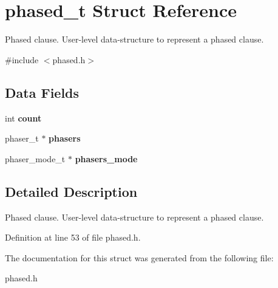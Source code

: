 \hypertarget{structphased__t}{\section{phased\-\_\-t Struct Reference}
\label{structphased__t}
}


Phased clause. User-\/level data-\/structure to represent a phased clause.  




{\ttfamily \#include $<$phased.\-h$>$}

\subsection*{Data Fields}
\begin{DoxyCompactItemize}
\item 
\hypertarget{structphased__t_a0bec2a4cb66b4f2de4a50cac22e5009a}{int {\bfseries count}}\label{structphased__t_a0bec2a4cb66b4f2de4a50cac22e5009a}

\item 
\hypertarget{structphased__t_a7798753bcab9768a4a83d812208e2705}{phaser\-\_\-t $\ast$ {\bfseries phasers}}\label{structphased__t_a7798753bcab9768a4a83d812208e2705}

\item 
\hypertarget{structphased__t_aace1e59143865b1769c00e8e6792cbab}{phaser\-\_\-mode\-\_\-t $\ast$ {\bfseries phasers\-\_\-mode}}\label{structphased__t_aace1e59143865b1769c00e8e6792cbab}

\end{DoxyCompactItemize}


\subsection{Detailed Description}
Phased clause. User-\/level data-\/structure to represent a phased clause. 

Definition at line 53 of file phased.\-h.



The documentation for this struct was generated from the following file\-:\begin{DoxyCompactItemize}
\item 
phased.\-h\end{DoxyCompactItemize}
